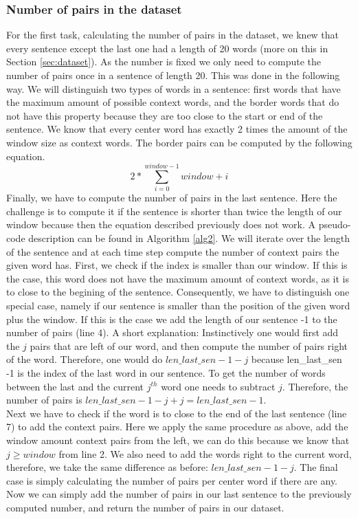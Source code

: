 \subsubsection{Number of pairs in the dataset}
For the first task, calculating the number of pairs in the dataset, we knew that every sentence except the last one had a length of 20 words (more on this in Section \ref{sec:dataset}). As the number is fixed we only need to compute the number of pairs once in a sentence of length 20. This was done in the following way. We will distinguish two types of words in a sentence: first words that have the maximum amount of possible context words, and the border words that do not have this property because they are too close to the start or end of the sentence.
We know that every center word has exactly 2 times the amount of the window size as context words. The border pairs can be computed by the following equation.
\begin{equation}
2 * \sum_{i=0}^{window -1} window + i
\end{equation}
Finally, we have to compute the number of pairs in the last sentence. Here the challenge is to compute it if the sentence is shorter than twice the length of our window because then the equation described previously does not work. A pseudo-code description can be found in Algorithm \ref{alg2}. We will iterate over the length of the sentence and at each time step compute the number of context pairs the given word has. First, we check if the index is smaller than our window. If this is the case, this word does not have the maximum amount of context words, as it is to close to the begining of the sentence. Consequently, we have to distinguish one special case, namely if our sentence is smaller than the position of the given word plus the window. If this is the case we add the length of our sentence -1 to the number of pairs (line 4). A short explanation: Instinctively one would first add the $j$ pairs that are left of our word, and then compute the number of pairs right of the word. Therefore, one would do $len\_last\_sen -1 -j$ because len\_last\_sen -1 is the index of the last word in our sentence. To get the number of words between the last and the current $j^{th}$ word one needs to subtract $j$. Therefore, the number of pairs is $len\_last\_sen -1 -j + j = len\_last\_sen -1$.\\ Next we have to check if the word is to close to the end of the last sentence (line 7) to add the context pairs. Here we apply the same procedure as above, add the window amount context pairs from the left, we can do this because we know that $j \geq window$ from line 2. We also need to add the words right to the current word, therefore, we take the same difference as before: $len\_last\_sen -1 -j$.
The final case is simply calculating the number of pairs per center word if there are any. \\
Now we can simply add the number of pairs in our last sentence to the previously computed number, and return the number of pairs in our dataset.

